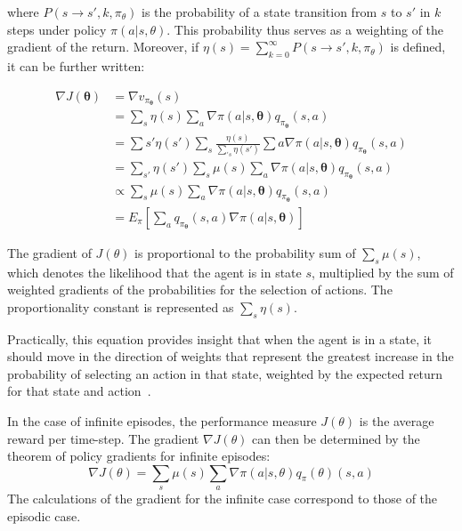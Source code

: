 \documentclass[../xlapes02]{subfiles}
\begin{document}
    where $P(s \rightarrow s', k, \pi_{\theta})$ is the probability of a state transition from $s$ to $s'$ in $k$ steps under policy $\pi(a | s, \theta)$. This probability thus serves as a weighting of the gradient of the return. Moreover, if $\eta(s) = \sum_{k=0}^{\infty} P(s \rightarrow s', k, \pi_{\theta})$ is defined, it can be further written:

    \begin{equation}
        \label{eq:policy_gradient}
        \begin{split}
            \nabla J(\mathbf{\theta}) &= \nabla v_{\pi_{\mathbf{\theta}}}(s) \\
            &= \sum_{s}\eta(s) \sum_{a}\nabla \pi(a | s, \mathbf{\theta})q_{\pi_{\mathbf{\theta}}}(s,a) \\
            &= \sum{s'}\eta(s') \sum_{s}\frac{\eta(s)}{\sum_{'s}\eta(s')} \sum{a} \nabla \pi(a | s, \mathbf{\theta})q_{\pi_{\mathbf{\theta}}}(s,a) \\
            &= \sum_{s'}\eta(s') \sum_{s}\mu(s) \sum_{a}\nabla \pi(a | s, \mathbf{\theta})q_{\pi_{\mathbf{\theta}}}(s,a)\\
            &\propto \sum_{s}\mu(s) \sum_{a}\nabla \pi(a | s, \mathbf{\theta})q_{\pi_{\mathbf{\theta}}}(s,a) \\
            &= E_{\pi} \left[\sum_{a}q_{\pi_{\mathbf{\theta}}}(s,a) \nabla \pi(a | s, \mathbf{\theta})  \right]
        \end{split}
    \end{equation}

    The gradient of \(J(\theta)\) is proportional to the probability sum of \(\sum_s \mu(s)\), which denotes the likelihood that the agent is in state \(s\), multiplied by the sum of weighted gradients of the probabilities for the selection of actions. The proportionality constant is represented as \(\sum_s \eta(s)\).

    Practically, this equation provides insight that when the agent is in a state, it should move in the direction of weights that represent the greatest increase in the probability of selecting an action in that state, weighted by the expected return for that state and action~\cite{FITMT25127}.

    In the case of infinite episodes, the performance measure \(J(\theta)\) is the average reward per time-step. The gradient \(\nabla J(\theta)\) can then be determined by the theorem of policy gradients for infinite episodes:
    \begin{equation}
        \nabla J(\theta) = \sum_s \mu(s) \sum_a \nabla \pi(a | s, \theta) q_\pi(\theta) (s, a)
    \end{equation}
    The calculations of the gradient for the infinite case correspond to those of the episodic case.
\end{document}
